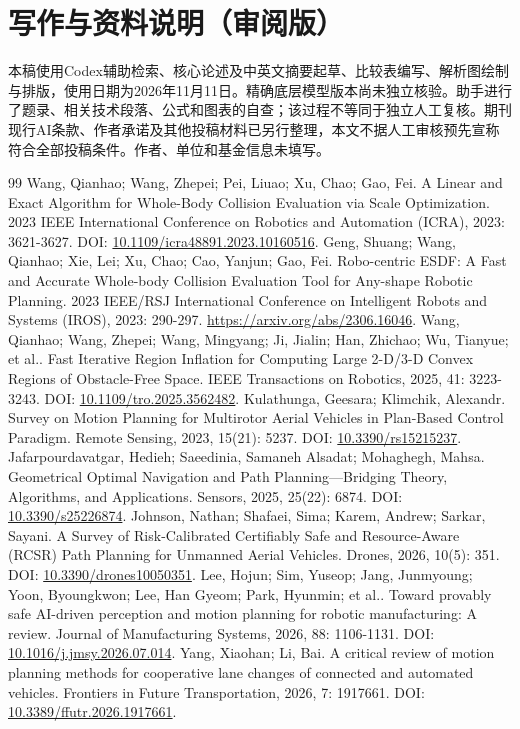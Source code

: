 \documentclass{aas}
\begin{document}
\section*{写作与资料说明（审阅版）}
本稿使用Codex辅助检索、核心论述及中英文摘要起草、比较表编写、解析图绘制与排版，使用日期为2026年11月11日。精确底层模型版本尚未独立核验。助手进行了题录、相关技术段落、公式和图表的自查；该过程不等同于独立人工复核。期刊现行AI条款、作者承诺及其他投稿材料已另行整理，本文不据人工审核预先宣称符合全部投稿条件。作者、单位和基金信息未填写。
\begin{thebibliography}{99}
 Wang, Qianhao; Wang, Zhepei; Pei, Liuao; Xu, Chao; Gao, Fei. A Linear and Exact Algorithm for Whole-Body Collision Evaluation via Scale Optimization. 2023 IEEE International Conference on Robotics and Automation (ICRA), 2023: 3621-3627. DOI: \url{10.1109/icra48891.2023.10160516}.
 Geng, Shuang; Wang, Qianhao; Xie, Lei; Xu, Chao; Cao, Yanjun; Gao, Fei. Robo-centric ESDF: A Fast and Accurate Whole-body Collision Evaluation Tool for Any-shape Robotic Planning. 2023 IEEE/RSJ International Conference on Intelligent Robots and Systems (IROS), 2023: 290-297. \url{https://arxiv.org/abs/2306.16046}.
 Wang, Qianhao; Wang, Zhepei; Wang, Mingyang; Ji, Jialin; Han, Zhichao; Wu, Tianyue; et al.. Fast Iterative Region Inflation for Computing Large 2-D/3-D Convex Regions of Obstacle-Free Space. IEEE Transactions on Robotics, 2025, 41: 3223-3243. DOI: \url{10.1109/tro.2025.3562482}.
 Kulathunga, Geesara; Klimchik, Alexandr. Survey on Motion Planning for Multirotor Aerial Vehicles in Plan-Based Control Paradigm. Remote Sensing, 2023, 15(21): 5237. DOI: \url{10.3390/rs15215237}.
 Jafarpourdavatgar, Hedieh; Saeedinia, Samaneh Alsadat; Mohaghegh, Mahsa. Geometrical Optimal Navigation and Path Planning---Bridging Theory, Algorithms, and Applications. Sensors, 2025, 25(22): 6874. DOI: \url{10.3390/s25226874}.
 Johnson, Nathan; Shafaei, Sima; Karem, Andrew; Sarkar, Sayani. A Survey of Risk-Calibrated Certifiably Safe and Resource-Aware (RCSR) Path Planning for Unmanned Aerial Vehicles. Drones, 2026, 10(5): 351. DOI: \url{10.3390/drones10050351}.
 Lee, Hojun; Sim, Yuseop; Jang, Junmyoung; Yoon, Byoungkwon; Lee, Han Gyeom; Park, Hyunmin; et al.. Toward provably safe AI-driven perception and motion planning for robotic manufacturing: A review. Journal of Manufacturing Systems, 2026, 88: 1106-1131. DOI: \url{10.1016/j.jmsy.2026.07.014}.
 Yang, Xiaohan; Li, Bai. A critical review of motion planning methods for cooperative lane changes of connected and automated vehicles. Frontiers in Future Transportation, 2026, 7: 1917661. DOI: \url{10.3389/ffutr.2026.1917661}.

\end{thebibliography}
\end{document}
